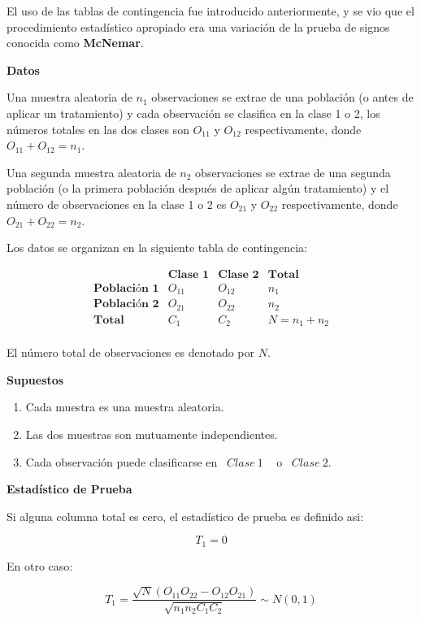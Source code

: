\documentclass[
  a4paper,
  oneside,
  openany]{book}
\begin{document}
El uso de las tablas de contingencia fue introducido anteriormente, y se vio que el procedimiento estadístico apropiado era una variación de la prueba de signos conocida como \textbf{McNemar}.

\textbf{Datos}

Una muestra aleatoria de \(n_{1}\) observaciones se extrae de una población (o antes de aplicar un tratamiento) y cada observación se clasifica en la clase 1 o 2, los números totales en las dos clases son \(O_{11}\) y \(O_{12}\) respectivamente, donde \(O_{11} + O_{12}= n_{1}\).

Una segunda muestra aleatoria de \(n_{2}\) observaciones se extrae de una segunda población (o la primera población después de aplicar algún tratamiento) y el número de observaciones en la clase 1 o 2 es \(O_{21}\) y \(O_{22}\) respectivamente, donde \(O_{21} +O_{22}=n_{2}\).

Los datos se organizan en la siguiente tabla de contingencia:

\[
\begin{array}{c|c|c|c}
 & \textbf{Clase 1} & \textbf{Clase 2} & \textbf{Total}     \\
\hline
\textbf{Población 1} & O_{11} & O_{12} & n_{1}   \\
\hline
\textbf{Población 2} & O_{21} & O_{22} & n_{2}\\
\hline
\textbf{Total}       & C_{1} & C_{2}   & N=n_{1}+n_{2} \\
\end{array}
\]

El número total de observaciones es denotado por \(N\).

\textbf{Supuestos}

\begin{enumerate}
\def\labelenumi{\arabic{enumi})}
\item
  Cada muestra es una muestra aleatoria.
\item
  Las dos muestras son mutuamente independientes.
\item
  Cada observación puede clasificarse en ~\(Clase\  1\) ~ o ~\(Clase\ 2\).
\end{enumerate}

\textbf{Estadístico de Prueba}

Si alguna columna total es cero, el estadístico de prueba es definido asi:

\[T_{1}=0\]

En otro caso:

\[T_{1}=\frac{\sqrt{N}(O_{11}O_{22}-O_{12}O_{21})}{\sqrt{n_{1}n_{2}C_{1}C_{2}}}\sim N(0,1)\]
\end{document}
